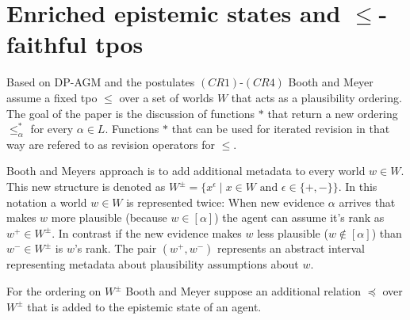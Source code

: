 \documentclass[11pt]{scrartcl}
\theoremstyle{definition}
\begin{document}
\section{Enriched epistemic states and $\leq$-faithful tpos}
Based on DP-AGM and the postulates $(CR1)$-$(CR4)$ Booth and Meyer assume a fixed tpo $\leq$ over a set of worlds $W$ that acts as a plausibility ordering. The goal of the paper is the discussion of functions $\ast$ that return a new ordering $\leq_{\alpha}^{\ast}$ for every $\alpha \in L$. Functions $\ast$ that can be used for iterated revision in that way are refered to as revision operators for $\leq$.

Booth and Meyers \cite{Booth2011} approach is to add additional metadata to every world $w \in W$. This new structure is denoted as $W^{\pm} = \{x^{\epsilon} \mid x \in W \textrm{ and } \epsilon \in \{+, -\}\}$. In this notation a world $w \in W$ is represented twice: When new evidence $\alpha$ arrives that makes $w$ more plausible (because $w \in [\alpha]$) the agent can assume it's rank as $w^{+} \in W^{\pm}$. In contrast if the new evidence makes $w$ less plausible ($w \notin [\alpha]$) than $w^{-} \in W^{\pm}$ is $w$'s rank. The pair $(w^{+}, w^{-})$ represents an abstract interval representing metadata about plausibility assumptions about $w$.

For the ordering on $W^{\pm}$ Booth and Meyer suppose an additional relation $\preceq$ over $W^{\pm}$ that is added to the epistemic state of an agent.
\end{document}

